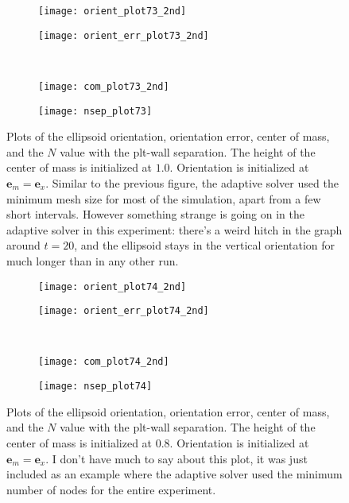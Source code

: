 \documentclass{article}
\newcommand{\vect}[1]{\boldsymbol{\mathbf{#1}}}
\begin{document}
\begin{figure}
  \centering
  \begin{subfigure}{0.49\textwidth}
    \texttt{[image: orient\_plot73\_2nd]}
  \end{subfigure}
  \hfill
  \begin{subfigure}{0.49\textwidth}
    \texttt{[image: orient\_err\_plot73\_2nd]}
  \end{subfigure}
  \\
  \begin{subfigure}{0.49\textwidth}
    \texttt{[image: com\_plot73\_2nd]}
  \end{subfigure}
  \hfill
  \begin{subfigure}{0.49\textwidth}
    \texttt{[image: nsep\_plot73]}
  \end{subfigure}  
  \caption{Plots of the ellipsoid orientation, orientation error,
    center of mass, and the $N$ value with the plt-wall
    separation. The height of the center of mass is initialized at
    $1.0$. Orientation is initialized at $\vect{e}_m =
    \vect{e}_x$. Similar to the previous figure, the adaptive solver
    used the minimum mesh size for most of the simulation, apart from
    a few short intervals. However something strange is going on in
    the adaptive solver in this experiment: there's a weird hitch in
    the graph around $t = 20$, and the ellipsoid stays in the vertical
    orientation for much longer than in any other run.}
  \label{fig:plt73}
\end{figure}

\begin{figure}
  \centering
  \begin{subfigure}{0.49\textwidth}
    \texttt{[image: orient\_plot74\_2nd]}
  \end{subfigure}
  \hfill
  \begin{subfigure}{0.49\textwidth}
    \texttt{[image: orient\_err\_plot74\_2nd]}
  \end{subfigure}
  \\
  \begin{subfigure}{0.49\textwidth}
    \texttt{[image: com\_plot74\_2nd]}
  \end{subfigure}
  \hfill
  \begin{subfigure}{0.49\textwidth}
    \texttt{[image: nsep\_plot74]}
  \end{subfigure}
  \caption{Plots of the ellipsoid orientation, orientation error,
    center of mass, and the $N$ value with the plt-wall
    separation. The height of the center of mass is initialized at
    $0.8$. Orientation is initialized at $\vect{e}_m = \vect{e}_x$. I
    don't have much to say about this plot, it was just included as an
    example where the adaptive solver used the minimum number of nodes
    for the entire experiment.}
  \label{fig:plt74}
\end{figure}
\end{document}
